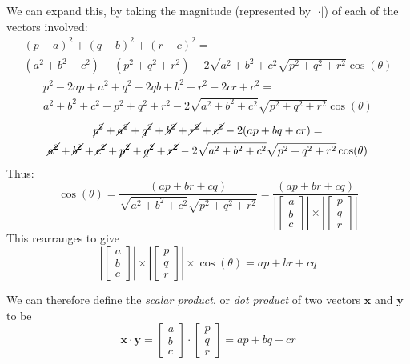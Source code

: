 \documentclass[11pt, a4paper]{article}
\begin{document}
We can expand this, by taking the magnitude (represented by $|\cdot|$) of each of the vectors involved:
\small
\begin{multline*}
(p-a)^{2}+(q-b)^{2}+(r-c)^{2}=\\ \left( a^{2} +b^{2} +c^{2} \right) + \left( p^{2} +q^{2} +r^{2} \right) - 2\sqrt{ a^{2} +b^{2} +c^{2}}\sqrt{ p^{2} +q^{2} +r^{2}}\cos(\theta)
\end{multline*}
\begin{multline*}
p^{2}-2ap+a^{2}+q^{2}-2qb+b^{2}+r^{2}-2cr+c^{2}=\\a^{2}+b^{2}+c^{2}+p^{2}+q^{2}+r^{2}-2\sqrt{ a^{2} +b^{2} +c^{2}}\sqrt{ p^{2} +q^{2} +r^{2}}\cos(\theta)
\end{multline*}
\begin{multline*}
\cancel{p^{2}}+\cancel{a^{2}}+\cancel{q^{2}}+\cancel{b^{2}}+\cancel{r^{2}}+\cancel{c^{2}}-2(ap+bq+cr)=\\\cancel{a^{2}}+\cancel{b^{2}}+\cancel{c^{2}}+\cancel{p^{2}}+\cancel{q^{2}}+\cancel{r^{2}}-2\sqrt{ a^{2} +b^{2} +c^{2}}\sqrt{ p^{2} +q^{2} +r^{2}}\cos(\theta)
\end{multline*}
\normalsize
Thus:
\begin{equation*}
\cos(\theta)=\frac{(ap+br+cq)}{\sqrt{ a^{2} +b^{2} +c^{2}}\sqrt{ p^{2} +q^{2} +r^{2}}}=\frac{(ap+br+cq)}{\left|\begin{bmatrix} a \\ b \\ c \end{bmatrix}\right|\times\left|\begin{bmatrix} p \\ q \\ r \end{bmatrix}\right|}
\end{equation*}
This rearranges to give
\begin{equation*}
\left|\begin{bmatrix} a \\ b \\ c \end{bmatrix}\right|\times\left|\begin{bmatrix} p \\ q \\ r \end{bmatrix}\right|\times \cos(\theta)=ap+br+cq
\end{equation*}

We can therefore define the \emph{scalar product}, or \emph{dot product} of two vectors $\boldsymbol{x}$ and $\boldsymbol{y}$ to be
\begin{equation*}
\boldsymbol{x}\cdot\boldsymbol{y}=\begin{bmatrix} a \\ b \\ c \end{bmatrix}\cdot\begin{bmatrix} p \\ q \\ r \end{bmatrix}=ap+bq+cr
\end{equation*}
\end{document}
